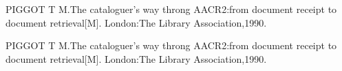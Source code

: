 
\renewcommand{\labelenumi}{[\arabic{enumi}] }

\item PIGGOT T M.The cataloguer’s way throng AACR2:from document receipt to document retrieval[M]. London:The Library Association,1990.

\item PIGGOT T M.The cataloguer’s way throng AACR2:from document receipt to document retrieval[M]. London:The Library Association,1990. 